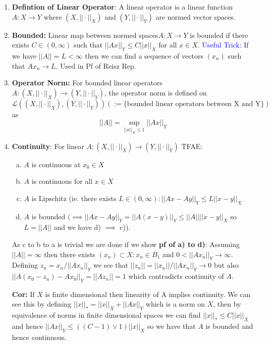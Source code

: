 \documentclass{article}
\begin{document}
\begin{enumerate}
    \item \textbf{Defintion of Linear Operator}: A linear operator is a linear function \(A: X \to Y\) where \((X, ||\cdot||_X)\) and \((Y, ||\cdot||_Y)\) are normed vector spaces.

    \item \textbf{Bounded:} Linear map between normed spaces\(A:X \to Y\) is bounded if there exists \(C \in (0, \infty)\) such that \(||Ax||_Y \leq C||x||_X\) for all \(x \in X\). \textcolor{blue}{Useful Trick:} If we have \(||A|| = L< \infty\) then we can find a sequence of vectors \((x_n)\) such that \(Ax_n \to L\). Used in Pf of Reisz Rep.

    \item \textbf{Operator Norm:} For bounded linear operators \(A: (X, ||\cdot||_X) \to (Y, ||\cdot||_Y)\), the operator norm is defined on \(\mathcal{L}((X, ||\cdot||_X), (Y, ||\cdot||_Y))(:= \{\text{bounded linear operators between X and Y}\})\) as
    \[
    ||A|| = \sup_{||x||_X \leq 1} ||Ax||_Y
    \]

    \item \textbf{Continuity}: For linear \(A: (X, ||\cdot||_X) \to (Y, ||\cdot||_Y)\) TFAE:
    \begin{enumerate} [a.]
        \item \(A\) is continuous at \(x_0 \in X\)
        \item \(A\) is continuous for all \(x \in X\)
        \item \(A\) is Lipschitz (ie. there exists \(L \in (0, \infty):||Ax - Ay||_Y \leq L||x - y||_X \)
        \item \(A\) is bounded \((\implies ||Ax - Ay||_Y = ||A(x-y)||_Y \leq ||A||||x-y||_X\) so \(L = ||A||\) and we have d) \(\implies\) c)).
    \end{enumerate}
    As c to b to a is trivial we are done if we show \textbf{pf of a) to d)}: Assuming \(||A|| = \infty\) then there exists \((x_n) \subset X:x_n \in \overline{B_1} \) and \(0<||Ax_n||_Y \to \infty\). Defining \(z_n = x_n/||Ax_n||_Y\) we see that \(||z_n|| = ||x_n||/||Ax_n||_Y \to 0\) but also \(||A(x_0-z_n) - Ax_0||_Y = ||Az_n|| = 1\) which contradicts continuity of \(A\).
    
    \textbf{Cor:} If \(X\) is finite dimensional then linearity of A implies continuity. We can see this by defining \(||x||_* = ||x||_X + ||Ax||_Y\) which is a norm on \(X\), then by equivalence of norms in finite dimensional spaces we can find \(||x||_* \leq C||x||_X\) and hence \(||Ax||_Y \leq ((C-1) \vee 1)||x||_X\) so we have that \(A\) is bounded and hence continuous.
    

\end{enumerate}
\end{document}
